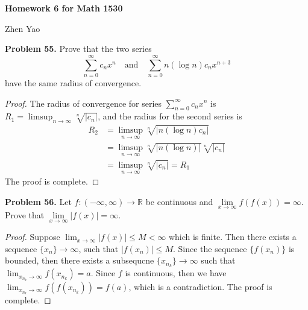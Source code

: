 \documentclass[12pt,leqno]{amsart}
\begin{document}
\centerline{\bf Homework 6 for Math 1530}
\centerline{Zhen Yao}



\bigskip


\noindent
{\bf Problem 55.}
Prove that the two series
$$
\sum_{n=0}^\infty c_n x^n
\quad
\text{and}
\quad
\sum_{n=0}^\infty n(\log n)c_n x^{n+3}
$$
have the same radius of convergence.
\begin{proof}
The radius of convergence for series $\sum_{n=0}^\infty c_n x^n$ is $R_1 = \limsup_{n\to\infty}\sqrt[n]{|c_n|}$, and the radius for the second series is 
\begin{align*}
    R_2 &= \limsup_{n\to\infty}\sqrt[n]{|n(\log n)c_n|}\\
    &= \limsup_{n\to\infty}\sqrt[n]{|n(\log n)|} \sqrt[n]{|c_n|} \\
    &= \limsup_{n\to\infty}\sqrt[n]{|c_n|} = R_1
\end{align*}
The proof is complete.
\end{proof}

\medskip


\noindent
{\bf Problem 56.}
Let $f:(-\infty,\infty)\rightarrow\mathbb R$ be continuous and $\lim\limits_{x\rightarrow\infty}f(f(x))=\infty$.
Prove that $\displaystyle \lim\limits_{x\rightarrow\infty}|f(x)|=\infty$.
\begin{proof}
Suppose $\lim_{x\to\infty}|f(x)| \leq M <\infty$ which is finite. Then there exists a sequence $\{x_n\}\to\infty$, such that $|f(x_n)|\leq M$. Since the sequence $\{f(x_n)\}$ is bounded, then there exists a subsequcne $\{x_{n_k}\}\to\infty$ such that $\lim_{x_{n_k}\to\infty}f(x_{n_k}) = a$. Since $f$ is continuous, then we have $\lim_{x_{n_k}\to\infty}f(f(x_{n_k})) = f(a)$, which is a contradiction. The proof is complete.
\end{proof}

\medskip
\end{document}
